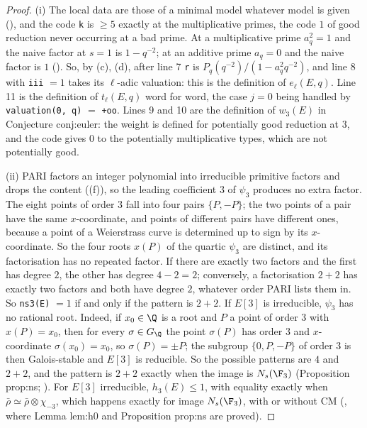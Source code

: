 \begin{sloppypar}
\begin{proof}
(i) The local data are those of a minimal model whatever model is given (), and the code \texttt{k} is $\ge5$
exactly at the multiplicative primes, the code $1$ of good reduction never occurring at a bad prime. At a multiplicative prime $a_q^2=1$ and the
naive factor at $s=1$ is $1-q^{-2}$; at an additive prime $a_q=0$ and the naive factor is $1$ (). So, by
(c), (d), after line 7 \texttt{r} is $P_q(q^{-2})/(1-a_q^2q^{-2})$, and line 8 with \texttt{iii} $=1$ takes its
$\ell$-adic valuation: this is the definition of $e_\ell(E,q)$. Line 11 is the definition of $t_\ell(E,q)$ word for word, the case $j=0$ being
handled by \texttt{valuation(0, q)} $=$ \texttt{+oo}. Lines 9 and 10 are the definition of $w_3(E)$ in Conjecture conj:euler: the weight is defined
for potentially good reduction at $3$, and the code gives $0$ to the potentially multiplicative types, which are not potentially good.

(ii) PARI factors an integer polynomial into irreducible primitive factors and drops the content ((f)), so the
leading coefficient $3$ of $\psi_3$ produces no extra factor. The eight points of order $3$ fall into four pairs $\{P,-P\}$; the two points of a pair
have the same $x$-coordinate, and points of different pairs have different ones, because a point of a Weierstrass curve is determined up to sign
by its $x$-coordinate. So the four roots $x(P)$ of the quartic $\psi_3$ are distinct, and its factorisation has no repeated factor. If
there are exactly two factors and the first has degree $2$, the other has degree $4-2=2$; conversely, a factorisation $2+2$ has exactly two
factors and both have degree $2$, whatever order PARI lists them in. So \texttt{ns3(E)} $=1$ if and only if the pattern is $2+2$. If $E[3]$ is
irreducible, $\psi_3$ has no rational root. Indeed, if $x_0\in\Q$ is a root and $P$ a point of order $3$ with $x(P)=x_0$, then for every
$\sigma\in G_\Q$ the point $\sigma(P)$ has order $3$ and $x$-coordinate $\sigma(x_0)=x_0$, so $\sigma(P)=\pm P$; the subgroup $\{0,P,-P\}$ of order $3$ is
then Galois-stable and $E[3]$ is reducible. So the possible patterns are $4$ and $2+2$, and the pattern is $2+2$ exactly when the image is $N_s(\F_3)$ (Proposition prop:ns;
). For $E[3]$ irreducible, $h_3(E)\le1$, with equality exactly when $\bar\rho\simeq\bar\rho\otimes\chi_{-3}$, which happens exactly for image
$N_s(\F_3)$, with or without CM (, where Lemma lem:h0 and Proposition prop:ns are proved).


\end{proof}
\end{sloppypar}
